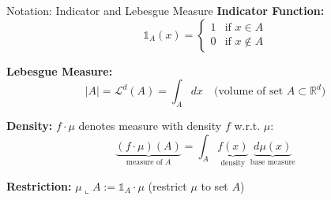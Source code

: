 \documentclass[aspectratio=169]{beamer}
\newcommand{\R}{\mathbb{R}}
\newcommand{\Ld}{\mathcal{L}^d}
\begin{document}
\begin{frame}{Notation: Indicator and Lebesgue Measure}
\textbf{Indicator Function:}
\[
\mathbb{1}_A(x) = \begin{cases} 1 & \text{if } x \in A \\ 0 & \text{if } x \notin A \end{cases}
\]

\vspace{0.3cm}
\textbf{Lebesgue Measure:}
\[
|A| = \Ld(A) = \int_A dx \quad \text{(volume of set } A \subset \R^d\text{)}
\]

\vspace{0.3cm}
\textbf{Density:} $f \cdot \mu$ denotes measure with density $f$ w.r.t. $\mu$:
\[
\underbrace{(f \cdot \mu)(A)}_{\text{measure of } A} = \int_A \underbrace{f(x)}_{\text{density}} \, \underbrace{d\mu(x)}_{\text{base measure}}
\]

\vspace{0.3cm}
\textbf{Restriction:} $\mu \llcorner A := \mathbb{1}_A \cdot \mu$ (restrict $\mu$ to set $A$)
\end{frame}
\end{document}

